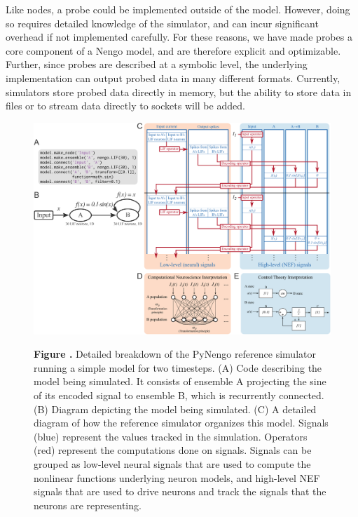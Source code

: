 \documentclass{frontiersSCNS}
\begin{document}
Like nodes, a probe could be implemented
outside of the model.
However, doing so requires detailed knowledge
of the simulator,
and can incur significant overhead
if not implemented carefully.
For these reasons, we have made probes
a core component of a Nengo model,
and are therefore explicit
and optimizable.
Further, since probes are described
at a symbolic level,
the underlying implementation
can output probed data in many different formats.
Currently, simulators store probed data
directly in memory,
but the ability to store data
in files or to stream data
directly to sockets will be added.

\begin{figure}
\begin{center}
  \includegraphics[width=\textwidth]{sim}
\end{center}
 \textbf{\label{fig:sim} Figure .}{
   Detailed breakdown of the PyNengo reference simulator
   running a simple model for two timesteps.
   (A) Code describing the model being simulated.
   It consists of ensemble A projecting the sine of its
   encoded signal to ensemble B,
   which is recurrently connected.
   (B) Diagram depicting the model being simulated.
   (C) A detailed diagram of how the reference simulator
   organizes this model. Signals (blue) represent the values
   tracked in the simulation.
   Operators (red) represent the computations done on signals.
   Signals can be grouped as low-level neural signals
   that are used to compute the nonlinear functions
   underlying neuron models,
   and high-level NEF signals that are used to
   drive neurons and track the signals
   that the neurons are representing.
}
\end{figure}
\end{document}
